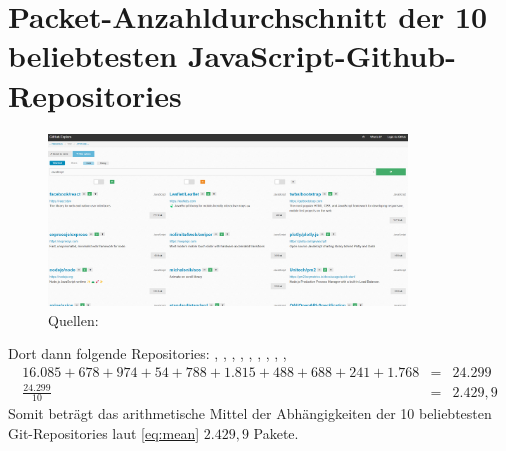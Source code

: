 \section{Packet-Anzahldurchschnitt der 10 beliebtesten JavaScript-Github-Repositories} \label{sec:PackageMeanPopGitJsRepos}
    \begin{figure}[h]
        \centering
        \includegraphics[width=0.85\textwidth]{Appendix/gitmost_wanted_2024-04-29 181855.png}
        \caption{Quellen: \cite{link:GitPopJsRepoMostWanted}}
        \label{png:gitMostWanted}
    \end{figure}
    Dort dann folgende Repositories: \cite{link:GitPopJsRepoReact}, \cite{link:GitPopJsRepoLeaflet}, \cite{link:GitPopJsRepoBootstrap}, \cite{link:GitPopJsRepoExpress}, \cite{link:GitPopJsRepoSwiper}, \cite{link:GitPopJsRepoPlotly}, \cite{link:GitPopJsRepoNode}, \cite{link:GitPopJsRepoAos}, \cite{link:GitPopJsRepoPm2}, \cite{link:GitPopJsRepoAxios}
    \begin{eqnarray}
        16.085 + 678 + 974 + 54 + 788 + 1.815 + 488 + 688 + 241 + 1.768 &=& 24.299
        \label{eq:summe} \\
        \frac{24.299}{10} &=& 2.429,9
        \label{eq:mean}
    \end{eqnarray}
    Somit beträgt das arithmetische Mittel der Abhängigkeiten der 10 beliebtesten Git-Repositories laut \eqref{eq:mean} $2.429,9$ Pakete.
